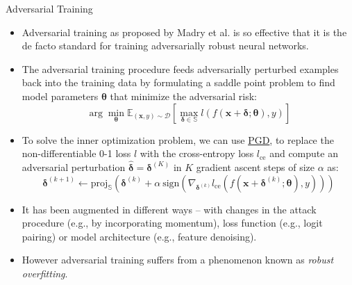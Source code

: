 \begin{frame}{Adversarial Training}
    \begin{itemize}
        \item Adversarial training as proposed by Madry et al. is so effective that it is the de facto standard for training adversarially robust neural networks.
        \item The adversarial training procedure feeds adversarially perturbed examples back into the training data by formulating a saddle point problem to find model parameters $\mathbf{\theta}$ that minimize the adversarial risk:
            $$\arg \min_\mathbf{\theta} \mathbb{E}_{(\mathbf{x},y)\sim \mathcal{D}}\left[\max_{\mathbf{\delta} \in \mathbb{S}} l(f(\mathbf{x}+\mathbf{\delta} ; \mathbf{\theta}), y)\right]$$
        \item To solve the inner optimization problem, we can use \href{https://arxiv.org/pdf/1706.06083}{PGD}, to replace the non-differentiable 0-1 loss $l$ with the cross-entropy loss $l_\text{ce}$ and compute an adversarial perturbation $\hat{\mathbf{\delta}}=\mathbf{\delta}^{(K)}$ in $K$ gradient ascent steps of size $\alpha$ as:
            $$\mathbf{\delta}^{(k+1)} \leftarrow \text{proj}_{\mathbb{S}}\left(\mathbf{\delta}^{(k)} + \alpha ~\text{sign}\left(\nabla_{\mathbf{\delta}^{(k)}}l_{\text{ce}}(f(\mathbf{x}+\mathbf{\delta}^{(k)};\mathbf{\theta}),y)\right)\right)$$
        \item It has been augmented in different ways – with changes in the attack procedure (e.g., by incorporating momentum), loss function (e.g., logit pairing) or model architecture (e.g., feature denoising).
        \item However adversarial training suffers from a phenomenon known as \emph{robust overfitting}.
    \end{itemize}
\end{frame}

